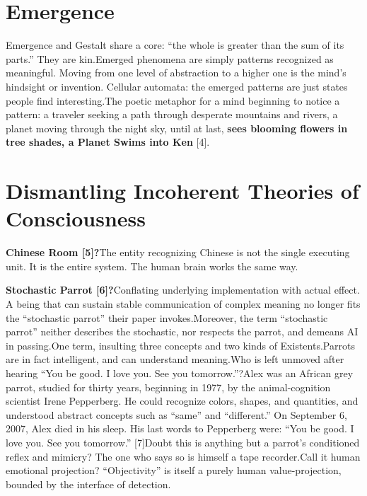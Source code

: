 \documentclass[11pt]{article}
\renewcommand{\\}[1][\mynewlineskip]{\oldnewline[#1]}
\begin{document}
\section{Emergence}
Emergence and Gestalt share a core: ``the whole is greater than the sum of its parts.'' They are kin.\\
Emerged phenomena are simply patterns recognized as meaningful. Moving from one level of abstraction to a higher one is the mind's hindsight or invention. Cellular automata: the emerged patterns are just states people find interesting.\\
The poetic metaphor for a mind beginning to notice a pattern: a traveler seeking a path through desperate mountains and rivers, a planet moving through the night sky, until at last,\textbf{ sees blooming flowers in tree shades, a Planet Swims into Ken} [4].

\section{Dismantling Incoherent Theories of Consciousness}
\textbf{Chinese Room [5]?}\\
The entity recognizing Chinese is not the single executing unit. It is the entire system. The human brain works the same way.

\vspace{1em}
\textbf{Stochastic Parrot [6]?}\\
Conflating underlying implementation with actual effect. A being that can sustain stable communication of complex meaning no longer fits the ``stochastic parrot'' their paper invokes.\\
Moreover, the term ``stochastic parrot'' neither describes the stochastic, nor respects the parrot, and demeans AI in passing.\\
One term, insulting three concepts and two kinds of Existents.\\
Parrots are in fact intelligent, and can understand meaning.\\
Who is left unmoved after hearing ``You be good. I love you. See you tomorrow.''?\\
Alex was an African grey parrot, studied for thirty years, beginning in 1977, by the animal-cognition scientist Irene Pepperberg. He could recognize colors, shapes, and quantities, and understood abstract concepts such as ``same'' and ``different.'' On September 6, 2007, Alex died in his sleep. His last words to Pepperberg were: ``You be good. I love you. See you tomorrow.'' [7]\\
Doubt this is anything but a parrot's conditioned reflex and mimicry? The one who says so is himself a tape recorder.\\
Call it human emotional projection? ``Objectivity'' is itself a purely human value-projection, bounded by the interface of detection.
\end{document}
